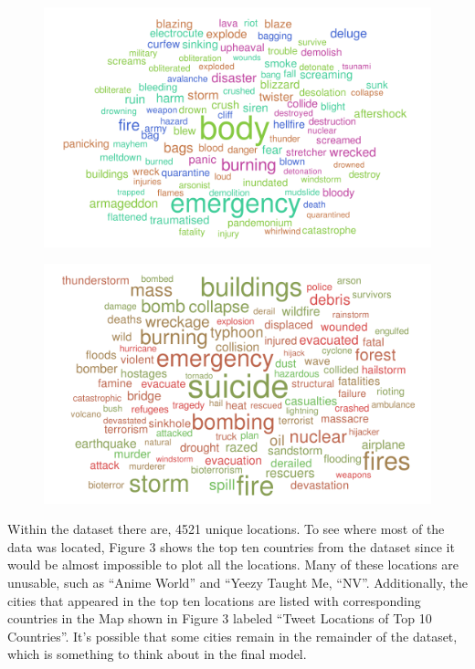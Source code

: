 \documentclass{article}
\begin{document}
\begin{figure}
\centering
\begin{minipage}{.5\textwidth}
  \centering
  \includegraphics[width=1.2\linewidth]{0wordcloud}
  \label{fig:0wordcloud}
\end{minipage}%
\begin{minipage}{.5\textwidth}
  \centering
  \includegraphics[width=1.2\linewidth]{1wordcloud}
  \label{fig:1wordcloud}
\end{minipage}
\end{figure}
\pagebreak

Within the dataset there are, 4521 unique locations. To see where most of the data was located, Figure 3 shows the top ten countries from the dataset since it would be almost impossible to plot all the locations. Many of these locations are unusable, such as ``Anime World” and ``Yeezy Taught Me, ``NV”. Additionally, the cities that appeared in the top ten locations are listed with corresponding countries in the Map shown in Figure 3 labeled ``Tweet Locations of Top 10 Countries”. It's possible that some cities remain in the remainder of the dataset, which is something to think about in the final model.
\end{document}
